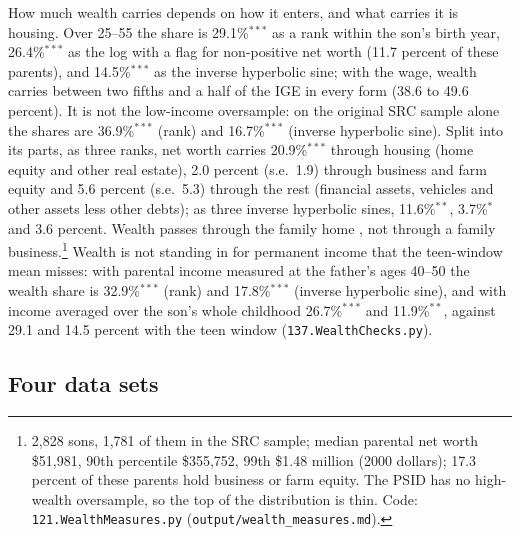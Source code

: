 How much wealth carries depends on how it enters, and what carries it is housing. Over 25--55 the share is
29.1\%$^{***}$ as a rank within the son's birth year, 26.4\%$^{***}$ as the log with a flag for non-positive net worth
(11.7 percent of these parents), and 14.5\%$^{***}$ as the inverse hyperbolic sine; with the wage, wealth carries
between two fifths and a half of the IGE in every form (38.6 to 49.6 percent). It is not the low-income oversample: on
the original SRC sample alone the shares are 36.9\%$^{***}$ (rank) and 16.7\%$^{***}$ (inverse hyperbolic sine). Split
into its parts, as three ranks, net worth carries 20.9\%$^{***}$ through housing (home equity and other real estate),
2.0 percent (s.e.\ 1.9) through business and farm equity and 5.6 percent (s.e.\ 5.3) through the rest (financial assets,
vehicles and other assets less other debts); as three inverse hyperbolic sines, 11.6\%$^{**}$, 3.7\%$^{*}$ and 3.6
percent. Wealth passes through the family home \citep[on wealth across generations,][]{pfeffer2018generations}, not through
a family business.\footnote{2,828 sons, 1,781 of them in the SRC sample; median parental net worth \$51,981,
90th percentile \$355,752, 99th \$1.48 million (2000 dollars); 17.3 percent of these parents hold business or farm
equity. The PSID has no high-wealth oversample, so the top of the distribution is thin. Code:
\texttt{121.WealthMeasures.py} (\texttt{output/wealth\_measures.md}).} Wealth is not standing in for permanent income
that the teen-window mean misses: with parental income measured at the father's ages 40--50 the wealth share is
32.9\%$^{***}$ (rank) and 17.8\%$^{***}$ (inverse hyperbolic sine), and with income averaged over the son's whole
childhood 26.7\%$^{***}$ and 11.9\%$^{**}$, against 29.1 and 14.5 percent with the teen window
(\texttt{137.WealthChecks.py}).



\subsection{Four data sets}

